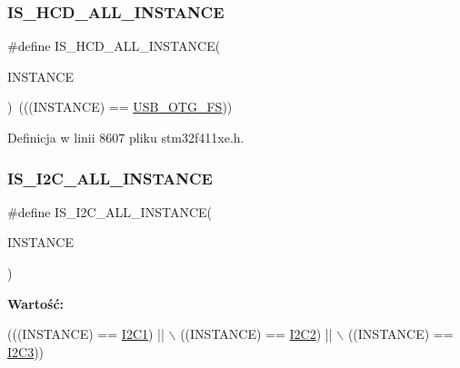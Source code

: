 \subsubsection{\texorpdfstring{I\+S\+\_\+\+H\+C\+D\+\_\+\+A\+L\+L\+\_\+\+I\+N\+S\+T\+A\+N\+CE}{IS\_HCD\_ALL\_INSTANCE}}
{\footnotesize\ttfamily \#define I\+S\+\_\+\+H\+C\+D\+\_\+\+A\+L\+L\+\_\+\+I\+N\+S\+T\+A\+N\+CE(\begin{DoxyParamCaption}\item[{}]{I\+N\+S\+T\+A\+N\+CE }\end{DoxyParamCaption})~(((I\+N\+S\+T\+A\+N\+CE) == \hyperlink{group___peripheral__declaration_ga9ebb053ee138fb47cdfede0e3371123d}{U\+S\+B\+\_\+\+O\+T\+G\+\_\+\+FS}))}



Definicja w linii 8607 pliku stm32f411xe.\+h.

\mbox{\label{group___exported__macros_gacdf0149a4e8c41a6814c13613c38a6b2}} 
\subsubsection{\texorpdfstring{I\+S\+\_\+\+I2\+C\+\_\+\+A\+L\+L\+\_\+\+I\+N\+S\+T\+A\+N\+CE}{IS\_I2C\_ALL\_INSTANCE}}
{\footnotesize\ttfamily \#define I\+S\+\_\+\+I2\+C\+\_\+\+A\+L\+L\+\_\+\+I\+N\+S\+T\+A\+N\+CE(\begin{DoxyParamCaption}\item[{}]{I\+N\+S\+T\+A\+N\+CE }\end{DoxyParamCaption})}

{\bfseries Wartość\+:}
\begin{DoxyCode}
(((INSTANCE) == \hyperlink{group___peripheral__declaration_gab45d257574da6fe1f091cc45b7eda6cc}{I2C1}) || \(\backslash\)
                                       ((INSTANCE) == \hyperlink{group___peripheral__declaration_gafa60ac20c1921ef1002083bb3e1f5d16}{I2C2}) || \(\backslash\)
                                       ((INSTANCE) == \hyperlink{group___peripheral__declaration_ga1489b37ed2bca9d9c659119590583bda}{I2C3}))
\end{DoxyCode}


